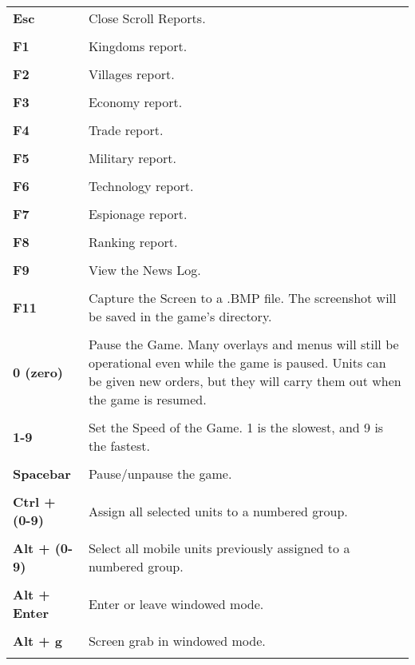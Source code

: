 \begin{tabular}{p{1in} p{3in}}
    \textbf{Esc} & Close Scroll Reports. \\ \\
    \textbf{F1} & Kingdoms report. \\ \\
    \textbf{F2} & Villages report. \\ \\
    \textbf{F3} & Economy report. \\ \\
    \textbf{F4} & Trade report. \\\\
    \textbf{F5} & Military report. \\ \\ 
    \textbf{F6} & Technology report. \\ \\
    \textbf{F7} & Espionage report. \\ \\
    \textbf{F8} & Ranking report. \\ \\
    \textbf{F9} & View the News Log. \\ \\
    \textbf{F11} & Capture the Screen to a .BMP file. The screenshot will be saved in the game’s directory. \\ \\


    \textbf{0 (zero)} & Pause the Game. Many overlays and menus will still be operational even while the game is paused. Units can be given new orders, but they will carry them out when the game is resumed.\\ \\
    \textbf{1-9} & Set the Speed of the Game. 1 is the slowest, and 9 is the fastest. \\ \\    
    \textbf{Spacebar} & Pause/unpause the game.\\ \\    
    \textbf{Ctrl + (0-9)} & Assign all selected units to a numbered group.\\ \\
    \textbf{Alt + (0-9)} & Select all mobile units previously assigned to a numbered group.\\ \\
    \textbf{Alt + Enter} & Enter or leave windowed mode.\\ \\
    \textbf{Alt + g} & Screen grab in windowed mode.\\ \\
\end{tabular}

